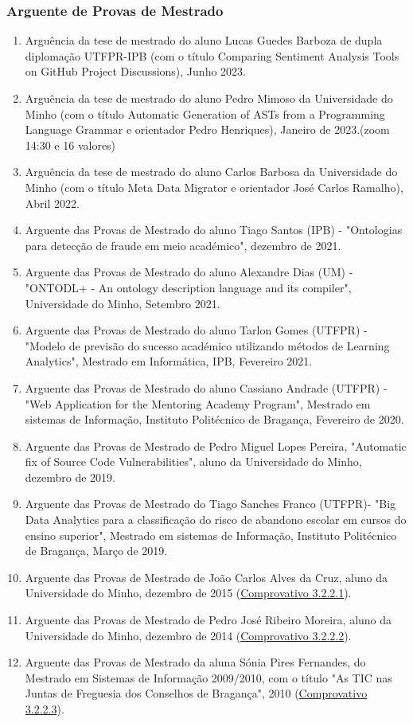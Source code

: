 \documentclass[11pt]{article}
\begin{document}
\subsubsection{Arguente de Provas de Mestrado}
\begin{enumerate}
\item {Arguência da tese de mestrado do aluno Lucas Guedes Barboza de dupla diplomação UTFPR-IPB (com o título Comparing Sentiment Analysis Tools on GitHub Project Discussions), Junho 2023.}
\item {Arguência da tese de mestrado do aluno Pedro Mimoso da Universidade do Minho (com o título Automatic Generation of ASTs from a Programming Language Grammar e orientador Pedro Henriques), Janeiro de 2023.(zoom 14:30 e 16 valores)}
\item {Arguência da tese de mestrado do aluno Carlos Barbosa da Universidade do Minho (com o título Meta Data Migrator e orientador José Carlos Ramalho), Abril 2022.}
\item {Arguente das Provas de Mestrado do aluno Tiago Santos (IPB) - "Ontologias para detecção de fraude em meio académico", dezembro de 2021.}
\item {Arguente das Provas de Mestrado do aluno Alexandre Dias (UM) - "ONTODL+ - An ontology description language and its compiler", Universidade do Minho, Setembro 2021.}
\item {Arguente das Provas de Mestrado do aluno Tarlon Gomes (UTFPR) - "Modelo de previsão do sucesso académico utilizando métodos de Learning Analytics", Mestrado em Informática, IPB, Fevereiro 2021.}
\item {Arguente das Provas de Mestrado do aluno Cassiano Andrade (UTFPR) - "Web Application for the Mentoring Academy Program", Mestrado em sistemas de Informação, Instituto Politécnico de Bragança, Fevereiro de 2020.}
\item {Arguente das Provas de Mestrado de Pedro Miguel Lopes Pereira, "Automatic fix of Source Code Vulnerabilities", aluno da Universidade do Minho, dezembro de 2019.}
\item {Arguente das Provas de Mestrado do Tiago Sanches Franco (UTFPR)- "Big Data Analytics para a classificação do risco de abandono escolar em cursos do ensino superior", Mestrado em sistemas de Informação, Instituto Politécnico de Bragança, Março de 2019.}
\item {Arguente das Provas de Mestrado de João Carlos Alves da Cruz, aluno da Universidade do Minho, dezembro de 2015 (\href{run:JuriProvas/ArguenteJoaoCruz.pdf}{Comprovativo 3.2.2.1}).}
\item {Arguente das Provas de Mestrado de Pedro José Ribeiro Moreira, aluno da Universidade do Minho, dezembro de 2014 (\href{run:JuriProvas/ArguentePedroMoreira.pdf}{Comprovativo 3.2.2.2}).}
\item {Arguente das Provas de Mestrado da aluna Sónia Pires Fernandes, do Mestrado em Sistemas de Informação 2009/2010, com o título "As TIC nas Juntas de Freguesia dos Conselhos de Bragança", 2010 (\href{run:JuriProvas/ArguenteSoniaPires.pdf}{Comprovativo 3.2.2.3}).}
\end{enumerate}
\end{document}
